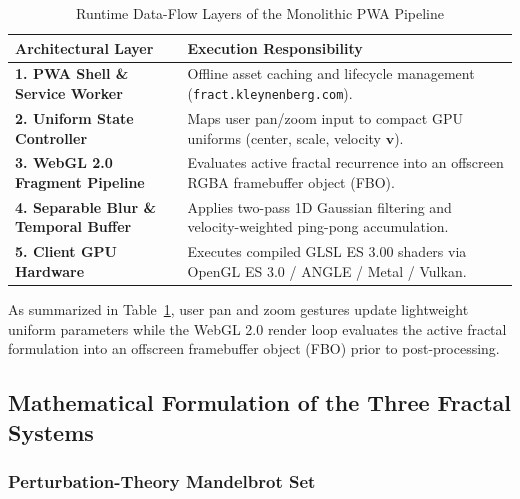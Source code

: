 \documentclass[11pt, a4paper]{article}
\begin{document}
\begin{table}[htbp]
  \centering
  \caption{Runtime Data-Flow Layers of the Monolithic PWA Pipeline}
  \label{tab:architecture}
  \vspace{0.35em}
  \begin{tabularx}{\textwidth}{@{}l X@{}}
    \toprule
    \textbf{Architectural Layer} & \textbf{Execution Responsibility} \\
    \midrule
    \textbf{1. PWA Shell \& Service Worker} & Offline asset caching and lifecycle management (\texttt{fract.kleynenberg.com}). \\
    \textbf{2. Uniform State Controller} & Maps user pan/zoom input to compact GPU uniforms (center, scale, velocity $\mathbf{v}$). \\
    \textbf{3. WebGL 2.0 Fragment Pipeline} & Evaluates active fractal recurrence into an offscreen RGBA framebuffer object (FBO). \\
    \textbf{4. Separable Blur \& Temporal Buffer} & Applies two-pass 1D Gaussian filtering and velocity-weighted ping-pong accumulation. \\
    \textbf{5. Client GPU Hardware} & Executes compiled GLSL ES 3.00 shaders via OpenGL ES 3.0 / ANGLE / Metal / Vulkan. \\
    \bottomrule
  \end{tabularx}
\end{table}

As summarized in Table~\ref{tab:architecture}, user pan and zoom gestures update lightweight uniform parameters while the WebGL 2.0 render loop evaluates the active fractal formulation into an offscreen framebuffer object (FBO) prior to post-processing.

\subsection{Mathematical Formulation of the Three Fractal Systems}

\subsubsection{Perturbation-Theory Mandelbrot Set}
\end{document}
